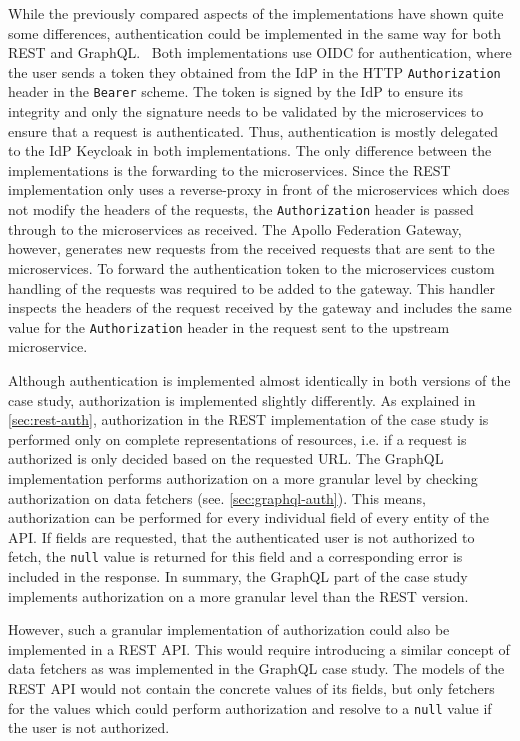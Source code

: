 While the previously compared aspects of the implementations have shown quite some differences, authentication could be implemented in the same way for both \ac{REST} and GraphQL.~
Both implementations use \ac{OIDC} for authentication, where the user sends a token they obtained from the \ac{IdP} in the \ac{HTTP} \texttt{Authorization} header in the \texttt{Bearer} scheme.
The token is signed by the \ac{IdP} to ensure its integrity and only the signature needs to be validated by the microservices to ensure that a request is authenticated.
Thus, authentication is mostly delegated to the \ac{IdP} Keycloak in both implementations.
The only difference between the implementations is the forwarding to the microservices.
Since the \ac{REST} implementation only uses a reverse-proxy in front of the microservices which does not modify the headers of the requests, the \texttt{Authorization} header is passed through to the microservices as received.
The Apollo Federation Gateway, however, generates new requests from the received requests that are sent to the microservices.
To forward the authentication token to the microservices custom handling of the requests was required to be added to the gateway.
This handler inspects the headers of the request received by the gateway and includes the same value for the \texttt{Authorization} header in the request sent to the upstream microservice.

Although authentication is implemented almost identically in both versions of the case study, authorization is implemented slightly differently.
As explained in \autoref{sec:rest-auth}, authorization in the \ac{REST} implementation of the case study is performed only on complete representations of resources, i.e. if a request is authorized is only decided based on the requested \ac{URL}.
The GraphQL implementation performs authorization on a more granular level by checking authorization on data fetchers (see. \autoref{sec:graphql-auth}).
This means, authorization can be performed for every individual field of every entity of the \ac{API}.
If fields are requested, that the authenticated user is not authorized to fetch, the \texttt{null} value is returned for this field and a corresponding error is included in the response.
In summary, the GraphQL part of the case study implements authorization on a more granular level than the \ac{REST} version.

However, such a granular implementation of authorization could also be implemented in a \ac{REST} \ac{API}.
This would require introducing a similar concept of data fetchers as was implemented in the GraphQL case study.
The models of the \ac{REST} \ac{API} would not contain the concrete values of its fields, but only fetchers for the values which could perform authorization and resolve to a \texttt{null} value if the user is not authorized. 

